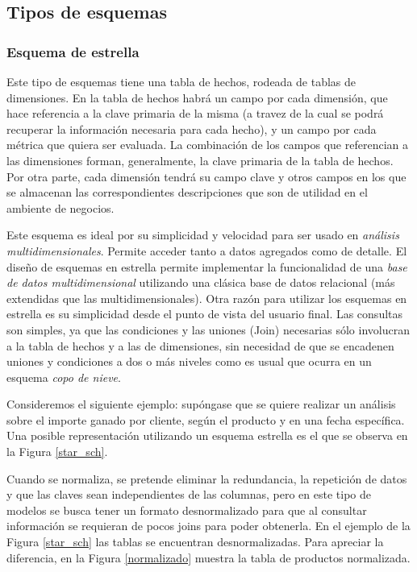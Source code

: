 \documentclass[a4paper,11pt]{article}
\begin{document}
    
    \subsection{Tipos de esquemas}
    
    \subsubsection{Esquema de estrella}
    
    Este tipo de esquemas tiene una tabla de hechos, rodeada de tablas de dimensiones. En la tabla de hechos habrá un campo por cada dimensión, que
    hace referencia a la clave primaria de la misma (a travez de la cual se podrá recuperar la información necesaria para cada hecho),
    y un campo por cada métrica que quiera ser evaluada. La combinación de los campos que referencian a las dimensiones forman, generalmente, la clave primaria de la
    tabla de hechos. Por otra parte, cada dimensión tendrá su campo clave y otros campos en los que se almacenan las correspondientes descripciones que son 
    de utilidad en el ambiente de negocios.
    
    Este esquema es ideal por su simplicidad y velocidad para ser usado en \textit{análisis multidimensionales}. Permite 
    acceder tanto a datos agregados como de detalle. El diseño de esquemas en estrella permite implementar la funcionalidad de una \textit{base de datos 
    multidimensional} utilizando una clásica base de datos relacional (más extendidas que las multidimensionales). Otra razón para utilizar los esquemas en 
    estrella es su simplicidad desde el punto de vista del usuario final. Las consultas son simples, ya que las condiciones y las uniones (Join) 
    necesarias sólo involucran a la tabla de hechos y a las de dimensiones, sin necesidad de que se encadenen uniones y condiciones a dos o más niveles como 
    es usual que ocurra en un esquema \textit{copo de nieve}.
    
    Consideremos el siguiente ejemplo: supóngase que se quiere realizar un análisis sobre el importe ganado por cliente, según el producto y en una fecha
    específica. Una posible representación utilizando un esquema estrella es el que se observa en la Figura \ref{star_sch}.
    
    Cuando se normaliza, se pretende eliminar la redundancia, la repetición de datos y que las claves sean independientes de
    las columnas, pero en este tipo de modelos se busca tener un formato desnormalizado para que al consultar información se requieran de pocos joins para
    poder obtenerla. En el ejemplo de la Figura \ref{star_sch} las tablas se encuentran desnormalizadas. Para apreciar la
    diferencia, en la Figura \ref{normalizado} muestra la tabla de productos normalizada.
    
\end{document}

